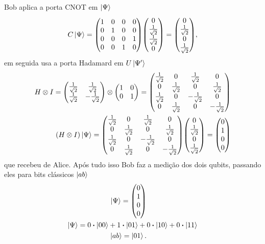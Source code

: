 \documentclass[a4paper, 12pt, oneside]{book}
\begin{document}
Bob aplica a porta CNOT em $\ket{\Psi}$
\begin{equation}
C\ket{\Psi} = \mqty(1&0&0&0\\0&1&0&0\\0&0&0&1\\0&0&1&0) 
			\mqty(0\\ \frac{1}{\sqrt{2}}\\ \frac{1}{\sqrt{2}}\\0)
		= \mqty(0\\ \frac{1}{\sqrt{2}}\\ 0\\ \frac{1}{\sqrt{2}}),
\end{equation}
em seguida usa a porta Hadamard em $U\ket{\Psi'}$
\begin{align}
H \otimes I = \mqty(\frac{1}{\sqrt{2}}&\frac{1}{\sqrt{2}}\\
				\frac{1}{\sqrt{2}}&-\frac{1}{\sqrt{2}} ) 
	\otimes \mqty(1&0\\0&1) 
= \mqty(\frac{1}{\sqrt{2}}&0&\frac{1}{\sqrt{2}}&0\\
	0&\frac{1}{\sqrt{2}}&0&\frac{1}{\sqrt{2}} \\
	\frac{1}{\sqrt{2}}&0&-\frac{1}{\sqrt{2}}&0 \\
	0&\frac{1}{\sqrt{2}}&0&-\frac{1}{\sqrt{2}}) \\
(H \otimes I)\ket{\Psi} =  \mqty(\frac{1}{\sqrt{2}}&0&\frac{1}{\sqrt{2}}&0\\
	0&\frac{1}{\sqrt{2}}&0&\frac{1}{\sqrt{2}} \\
	\frac{1}{\sqrt{2}}&0&-\frac{1}{\sqrt{2}}&0 \\
	0&\frac{1}{\sqrt{2}}&0&-\frac{1}{\sqrt{2}}) 
	\mqty(0\\ \frac{1}{\sqrt{2}}\\ 0\\ \frac{1}{\sqrt{2}}) = \mqty(0\\1\\0\\0)
\end{align}
que recebeu de Alice. Após tudo isso Bob faz a medição dos dois qubits, passando eles para bits clássicos $\ket{ab}$
\begin{align}
\ket{\Psi} = \mqty(0\\1\\0\\0) \hspace{2.5cm} \\
\ket{\Psi} = 0\vdot\ket{00} + 1\vdot\ket{01} + 0\vdot\ket{10} + 0\vdot\ket{11} \\
\ket{ab} = \ket{01}. \hspace{2.5cm}
\end{align}
\end{document}
